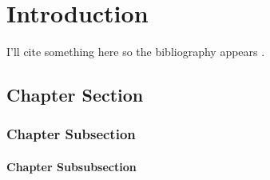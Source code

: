 \documentclass[thesis.tex]{subfiles}
\begin{document}
\chapter{Introduction}
I'll cite something here so the bibliography appears \cite{casella2002statistical}.\\
\lipsum[1-3]
\section{Chapter Section}
\lipsum[4-6]
\subsection{Chapter Subsection}
\lipsum[7-9]
\subsubsection{Chapter Subsubsection}
\lipsum[10-12]
\end{document}
